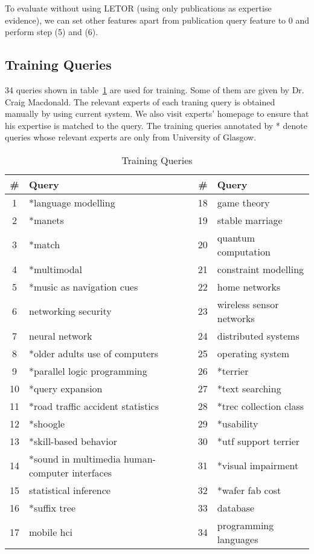 To evaluate without using LETOR (using only publications as expertise evidence), we can set other features apart from publication query feature to 0
and perform step (5) and (6).

\subsection{Training Queries}
34 queries shown in table~\ref{table:trainingqueries} are used for training. Some of them are given by Dr. Craig Macdonald. The relevant experts of each
traning query is obtained manually by using current system. We also visit experts' homepage to ensure that his expertise is matched to the query.
The training queries annotated by * denote queries whose relevant experts are only from University of Glasgow. 
\begin{table}
\centering
\begin{tabular}{|c|l|c|l|}
\hline \textbf{\#} & \textbf{Query} & \textbf{\#} & \textbf{Query} \\
\hline 1 & *language modelling & 18 & game theory\\
\hline 2 & *manets & 19 & stable marriage \\
\hline 3  & *match & 20 & quantum computation\\ 
\hline 4  & *multimodal & 21 & constraint modelling\\ 
\hline 5  & *music as navigation cues & 22 & home networks\\ 
\hline 6  & networking security & 23 & wireless sensor networks\\ 
\hline 7  & neural network & 24 & distributed systems\\ 
\hline 8  & *older adults use of computers & 25 & operating system\\ 
\hline 9  & *parallel logic programming & 26 & *terrier\\ 
\hline 10  & *query expansion & 27 & *text searching\\ 
\hline 11  & *road traffic accident statistics & 28 & *trec collection class\\ 
\hline 12  & *shoogle & 29 & *usability\\ 
\hline 13  & *skill-based behavior & 30 & *utf support terrier\\ 
\hline 14  & *sound in multimedia human-computer interfaces & 31 & *visual impairment\\ 
\hline 15  & statistical inference & 32 & *wafer fab cost \\ 
\hline 16  & *suffix tree & 33 & database\\ 
\hline 17  & mobile hci & 34 & programming languages\\ 
\hline
\end{tabular}
\caption{Training Queries} \label{table:trainingqueries}
\end{table}

